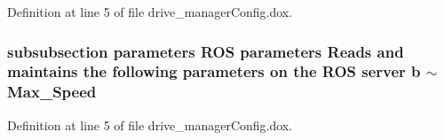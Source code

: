 \-Definition at line 5 of file drive\-\_\-manager\-Config.\-dox.

\subsubsection[{$\sim$\-Max\-\_\-\-Speed}]{\setlength{\rightskip}{0pt plus 5cm}subsubsection parameters \-R\-O\-S parameters \-Reads and maintains the following parameters on the \-R\-O\-S server b $\sim$\-Max\-\_\-\-Speed}\label{drive__managerConfig_8dox_abe90fc1ad33d79f3b954d2aeab7ec43f}


\-Definition at line 5 of file drive\-\_\-manager\-Config.\-dox.

